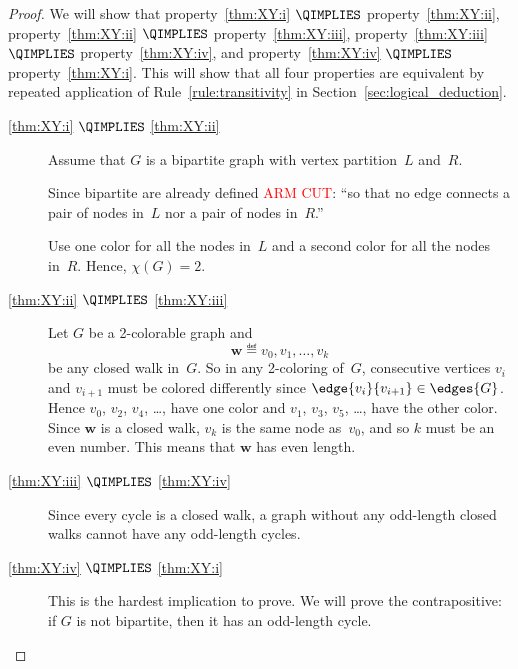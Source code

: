 \begin{proof}

We will show that
property~\ref{thm:XY:i} $\QIMPLIES$ property~\ref{thm:XY:ii}, 
property~\ref{thm:XY:ii} $\QIMPLIES$ property~\ref{thm:XY:iii}, 
property~\ref{thm:XY:iii} $\QIMPLIES$ property~\ref{thm:XY:iv}, and
property~\ref{thm:XY:iv} $\QIMPLIES$ property~\ref{thm:XY:i}.  This
will show that all four properties are equivalent by repeated
application of Rule~\ref{rule:transitivity} in
Section~\ref{sec:logical_deduction}.

\begin{description}

\item[\ref{thm:XY:i} $\QIMPLIES$ \ref{thm:XY:ii}]

Assume that $G$ is a bipartite graph with vertex partition~$L$
and~$R$. 
\begin{editingnotes}
Since bipartite are already defined \textcolor{red}{ARM CUT}: ``so that no edge
connects a pair of nodes in~$L$ nor a pair of nodes in~$R$.''
\end{editingnotes}
Use one color for all the nodes in~$L$ and a second color for all the
nodes in~$R$.  Hence, $\chi(G) = 2$.

\item[\ref{thm:XY:ii} $\QIMPLIES$ \ref{thm:XY:iii}]

Let $G$ be a 2-colorable graph and
\begin{equation*}
    \mathbf{w} \eqdef v_0, v_1, \dots, v_k
\end{equation*}
be any closed walk in~$G$.  So in any 2-coloring of~$G$, consecutive
vertices $v_i$ and $v_{i + 1}$ must be colored differently since
$\edge{v_i}{v_{i + 1}} \in \edges{G}$.  
Hence $v_0$, $v_2$, $v_4$, \dots, have one color and $v_1$, $v_3$,
$v_5$, \dots, have the other color.  Since $\mathbf{w}$ is a closed
walk, $v_k$ is the same node as~$v_0$, and so $k$ must be an even
number.  This means that $\mathbf{w}$ has even length.

\item[\ref{thm:XY:iii} $\QIMPLIES$ \ref{thm:XY:iv}]

Since every cycle is a closed walk, a graph without any odd-length
closed walks cannot have any odd-length cycles.

\item[\ref{thm:XY:iv} $\QIMPLIES$ \ref{thm:XY:i}]

  This is the hardest implication to prove.  We will prove the
  contrapositive: if $G$ is not bipartite, then it has an odd-length
  cycle.


\end{description}
\end{proof}
